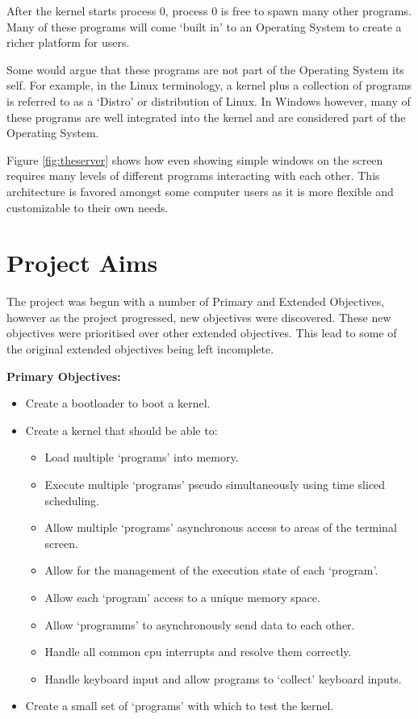 \documentclass[a4paper]{report}
\begin{document}
After the kernel starts process 0, process 0 is free to spawn many other programs. Many of these programs will come `built in' to an Operating System to create a richer platform for users.

Some would argue that these programs are not part of the Operating System its self. For example, in the Linux terminology, a kernel plus a collection of programs is referred to as a `Distro' or distribution of Linux. In Windows however, many of these programs are well integrated into the kernel and are considered part of the Operating System.

Figure \ref{fig:theserver} shows how even showing simple windows on the screen requires many levels of different programs interacting with each other. This architecture is favored amongst some computer users as it is more flexible and customizable to their own needs.
















\clearpage
\section {Project Aims}

The project was begun with a number of Primary and Extended Objectives, however as the project progressed, new objectives were discovered. These new objectives were prioritised over other extended objectives. This lead to some of the original extended objectives being left incomplete.

\textbf {Primary Objectives:}

\begin{itemize}
\item Create a bootloader to boot a kernel.
\item Create a kernel that should be able to:
\begin{itemize}
\item Load multiple `programs' into memory.
\item Execute multiple `programs' pseudo simultaneously using time sliced scheduling.
\item Allow multiple `programs' asynchronous access to areas of the terminal screen.
\item Allow for the management of the execution state of each `program'.
\item Allow each `program' access to a unique memory space.
\item Allow `programms' to asynchronously send data to each other.
\item Handle all common cpu interrupts and resolve them correctly.
\item Handle keyboard input and allow programs to `collect' keyboard inputs.
\end{itemize}
\item Create a small set of `programs' with which to test the kernel.
\end{itemize}
\end{document}
